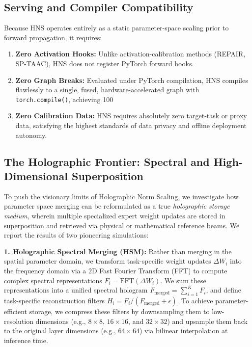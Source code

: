 \documentclass{article}
\theoremstyle{plain}
\theoremstyle{definition}
\theoremstyle{remark}
\begin{document}
\subsection{Serving and Compiler Compatibility}
Because HNS operates entirely as a static parameter-space scaling prior to forward propagation, it requires:
\begin{enumerate}
  \item \textbf{Zero Activation Hooks:} Unlike activation-calibration methods (REPAIR, SP-TAAC), HNS does not register PyTorch forward hooks.
  \item \textbf{Zero Graph Breaks:} Evaluated under PyTorch compilation, HNS compiles flawlessly to a single, fused, hardware-accelerated graph with \texttt{torch.compile()}, achieving 100%
  \item \textbf{Zero Calibration Data:} HNS requires absolutely zero target-task or proxy data, satisfying the highest standards of data privacy and offline deployment autonomy.
\end{enumerate}

\subsection{The Holographic Frontier: Spectral and High-Dimensional Superposition}
To push the visionary limits of Holographic Norm Scaling, we investigate how parameter space merging can be reformulated as a true \textit{holographic storage medium}, wherein multiple specialized expert weight updates are stored in superposition and retrieved via physical or mathematical reference beams. We report the results of two pioneering simulations:

\textbf{1. Holographic Spectral Merging (HSM):} Rather than merging in the spatial parameter domain, we transform task-specific weight updates $\Delta W_i$ into the frequency domain via a 2D Fast Fourier Transform (FFT) to compute complex spectral representations $F_i = \text{FFT}(\Delta W_i)$. We sum these representations into a unified spectral hologram $F_{\text{merged}} = \sum_{i=1}^K F_i$, and define task-specific reconstruction filters $H_i = F_i / (F_{\text{merged}} + \epsilon)$. To achieve parameter-efficient storage, we compress these filters by downsampling them to low-resolution dimensions (e.g., $8\times8$, $16\times16$, and $32\times32$) and upsample them back to the original layer dimensions (e.g., $64\times64$) via bilinear interpolation at inference time.
\end{document}
